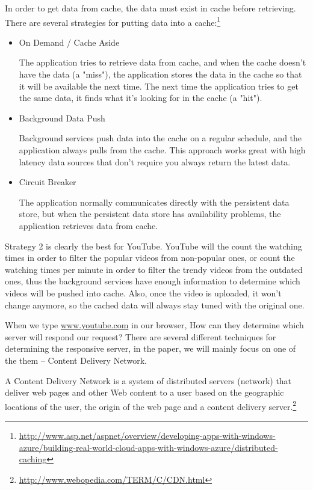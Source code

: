 \documentclass{article}
\begin{document}
In order to get data from cache, the data must exist in cache before retrieving. There are several strategies for putting data into a cache:\footnote{\url{http://www.asp.net/aspnet/overview/developing-apps-with-windows-azure/building-real-world-cloud-apps-with-windows-azure/distributed-caching}}
\begin{itemize}
	\item On Demand / Cache Aside
	
	The application tries to retrieve data from cache, and when the cache doesn't have the data (a "miss"), the application stores the data in the cache so that it will be available the next time. The next time the application tries to get the same data, it finds what it's looking for in the cache (a "hit"). 
	
	\item Background Data Push
	
	Background services push data into the cache on a regular schedule, and the application always pulls from the cache. This approach works great with high latency data sources that don't require you always return the latest data.
	
	\item Circuit Breaker
	
	The application normally communicates directly with the persistent data store, but when the persistent data store has availability problems, the application retrieves data from cache.
\end{itemize}
Strategy 2 is clearly the best for YouTube. YouTube will the count the watching times in order to filter the popular videos from non-popular ones, or count the watching times per minute in order to filter the trendy videos from the outdated ones, thus the background services have enough information to determine which videos will be pushed into cache. Also, once the video is uploaded, it won't change anymore, so the cached data will always stay tuned with the original one.

When we type \url{www.youtube.com} in our browser, How can they determine which server will respond our request? There are several different techniques for determining the responsive server, in the paper, we will mainly focus on one of the them -- Content Delivery Network.

A Content Delivery Network is a system of distributed servers (network) that deliver web pages and other Web content to a user based on the geographic locations of the user, the origin of the web page and a content delivery server.\footnote{\url{http://www.webopedia.com/TERM/C/CDN.html}}
\end{document}

